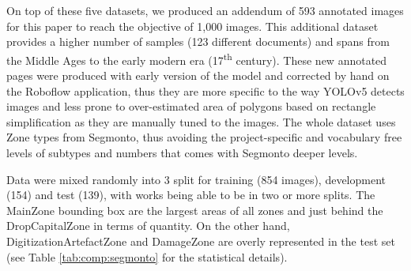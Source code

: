\documentclass{jdmdh}
\begin{document}
On top of these five datasets, we produced an addendum of 593 annotated images for this paper to reach the objective of 1,000 images. This additional dataset provides a higher number of samples (123 different documents) and spans from the Middle Ages to the early modern era (17\textsuperscript{th} century). These new annotated pages were produced with early version of the model and corrected by hand on the Roboflow application, thus they are more specific to the way YOLOv5 detects images and less prone to over-estimated area of polygons based on rectangle simplification as they are manually tuned to the images. The whole dataset uses Zone types from Segmonto, thus avoiding the project-specific and vocabulary free levels of subtypes and numbers that comes with Segmonto deeper levels. 

\begin{table}[h]
    \centering
\resizebox{\linewidth}{!}{%
    \begin{tabular}{l|rrrrrr}
         \hline
         Dataset & ``Books'' & Pages & Starting century & Ending century & Type & With B\&W \\ \hline
         \citep{pinche2022cremma} & 13 & 263 & 12 & 15 & Manuscripts & Yes \\
         \citep{clerice2022cremma} & 7 & 30 & 13 & 15 & Manuscripts & Yes \\ 
         \citep{vlachou-efstathiou2022voss} & 2 & 129 & 9 & 9 & Manuscripts & No \\
         \citep{pinche2022mss} & 1 & 20 & 15 & 15 & Manuscripts & No \\
         \citep{pinche2022goth} & 4 & 80 & 16 & 16 & Printed & No \\
         \textit{Original Data} & 123 & 593 & 9 & 17 & Mixed & No \\ \hline
         \textbf{Total} & 150 & 1110 & 9 & 17 & Mixed & Yes \\ \hline
    \end{tabular}%
    }
    \caption{Quantitative and qualitative description of YALTAi MSS EPB. ``Books'' can be full manuscripts or printed books. \textit{Original data} are previously unpublished data produced directly using bounding boxes.}
    \label{tab:dataset:mssepb}
\end{table}

Data were mixed randomly into 3 split for training (854 images), development (154) and test (139), with works being able to be in two or more splits. The MainZone bounding box are the largest areas of all zones and just behind the DropCapitalZone in terms of quantity. On the other hand, DigitizationArtefactZone and DamageZone are overly represented in the test set (see Table \ref{tab:comp:segmonto} for the statistical details).
\end{document}
